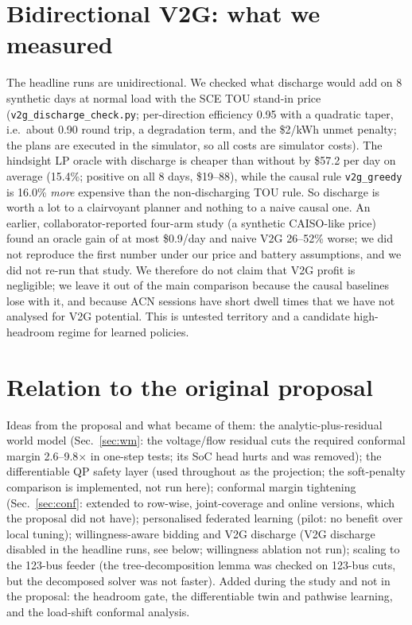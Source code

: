 \documentclass[10pt]{article}
\begin{document}
\section{Bidirectional V2G: what we measured}\label{sec:v2g}
The headline runs are unidirectional. We checked what discharge would add on 8 synthetic days at normal load with the SCE TOU stand-in price (\texttt{v2g\_discharge\_check.py}; per-direction efficiency 0.95 with a quadratic taper, i.e.\ about 0.90 round trip, a degradation term, and the \$2/kWh unmet penalty; the plans are executed in the simulator, so all costs are simulator costs). The hindsight LP oracle with discharge is cheaper than without by \$57.2 per day on average (15.4\%; positive on all 8 days, \$19--88), while the causal rule \texttt{v2g\_greedy} is 16.0\% \emph{more} expensive than the non-discharging TOU rule. So discharge is worth a lot to a clairvoyant planner and nothing to a naive causal one. An earlier, collaborator-reported four-arm study (a synthetic CAISO-like price) found an oracle gain of at most \$0.9/day and naive V2G 26--52\% worse; we did not reproduce the first number under our price and battery assumptions, and we did not re-run that study. We therefore do not claim that V2G profit is negligible; we leave it out of the main comparison because the causal baselines lose with it, and because ACN sessions have short dwell times that we have not analysed for V2G potential. This is untested territory and a candidate high-headroom regime for learned policies.

\section{Relation to the original proposal}
Ideas from the proposal and what became of them: the analytic-plus-residual world model (Sec.~\ref{sec:wm}: the voltage/flow residual cuts the required conformal margin 2.6--9.8$\times$ in one-step tests; its SoC head hurts and was removed); the differentiable QP safety layer (used throughout as the projection; the soft-penalty comparison is implemented, not run here); conformal margin tightening (Sec.~\ref{sec:conf}: extended to row-wise, joint-coverage and online versions, which the proposal did not have); personalised federated learning (pilot: no benefit over local tuning); willingness-aware bidding and V2G discharge (V2G discharge disabled in the headline runs, see below; willingness ablation not run); scaling to the 123-bus feeder (the tree-decomposition lemma was checked on 123-bus cuts, but the decomposed solver was not faster). Added during the study and not in the proposal: the headroom gate, the differentiable twin and pathwise learning, and the load-shift conformal analysis.
\end{document}
